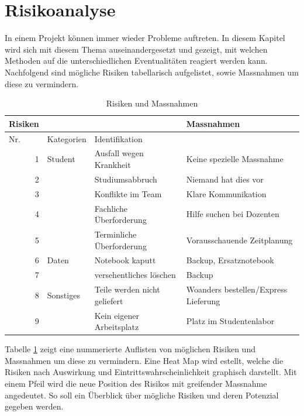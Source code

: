 \section{Risikoanalyse}
In einem Projekt können immer wieder Probleme auftreten. In diesem Kapitel wird sich mit diesem Thema auseinandergesetzt und gezeigt, mit welchen Methoden auf die unterschiedlichen Eventualitäten reagiert werden kann.
Nachfolgend sind mögliche Risiken tabellarisch aufgelistet, sowie Massnahmen um diese zu vermindern.\\
\begin{table}[htbp]
  \centering
  \caption{Risiken und Massnahmen}
    \begin{tabular}{|r|r|l|l|}
    \toprule
    \multicolumn{1}{|l}{\textbf{Risiken}} & \multicolumn{1}{r}{} &       & \textbf{Massnahmen} \\
    \hline
    \multicolumn{1}{|l|}{Nr.} & \multicolumn{1}{l|}{Kategorien} & Identifikation &  \\
    \hline
    1     & \multicolumn{1}{l|}{Student} & Ausfall wegen Krankheit & Keine spezielle Massnahme \\
\cline{1-1}\cline{3-4}    2     &       & Studiumsabbruch & Niemand hat dies vor \\
\cline{1-1}\cline{3-4}    3     &       & Konflikte im Team & Klare Kommunikation \\
\cline{1-1}\cline{3-4}    4     &       & Fachliche Überforderung & Hilfe suchen bei Dozenten \\
\cline{1-1}\cline{3-4}    5     &       & Terminliche Überforderung & Vorausschauende Zeitplanung \\
    \hline
    6     & \multicolumn{1}{l|}{Daten} & Notebook kaputt & Backup, Ersatznotebook \\
\cline{1-1}\cline{3-4}    7     &       & versehentliches löschen & Backup \\
    \hline
    8     & \multicolumn{1}{l|}{Sonstiges} & Teile werden nicht geliefert & Woanders bestellen/Express Lieferung\\
\cline{1-1}\cline{3-4}    9     &       & Kein eigener Arbeitsplatz & Platz im Studentenlabor \\
    \bottomrule
    \end{tabular}%
  \label{tab:RisikenUndMassnahmen}%
\end{table}%

Tabelle \ref{tab:RisikenUndMassnahmen} zeigt eine nummerierte Auflisten von möglichen Risiken und Massnahmen um diese zu vermindern. Eine Heat Map wird estellt, welche die Risiken nach Auswirkung und Eintrittswahrscheinlichkeit graphisch darstellt. Mit einem Pfeil wird die neue Position des Risikos mit greifender Massnahme angedeutet. So soll ein Überblick über mögliche Risiken und deren Potenzial gegeben werden.\\

